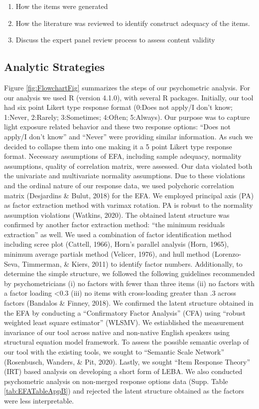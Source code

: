 \documentclass[
  english,
  man]{apa6}
\providecommand{\tightlist}{%
  \setlength{\itemsep}{0pt}\setlength{\parskip}{0pt}}
\begin{document}
\begin{enumerate}
\def\labelenumi{\arabic{enumi}.}
\tightlist
\item
  How the items were generated
\item
  How the literature was reviewed to identify construct adequacy of the items.
\item
  Discuss the expert panel review process to assess content validity
\end{enumerate}

\hypertarget{analytic-strategies}{%
\subsection{Analytic Strategies}\label{analytic-strategies}}

Figure \ref{fig:FlowchartFig} summarizes the steps of our psychometric analysis. For our analysis we used R (version 4.1.0), with several R packages. Initially, our tool had six point Likert type response format (0:Does not apply/I don't know; 1:Never, 2:Rarely; 3:Sometimes; 4:Often; 5:Always). Our purpose was to capture light exposure related behavior and these two response options: ``Does not apply/I don't know'' and ``Never'' were providing similar information. As such we decided to collapse them into one making it a 5 point Likert type response format. Necessary assumptions of EFA, including sample adequacy, normality assumptions, quality of correlation matrix, were assessed. Our data violated both the univariate and multivariate normality assumptions. Due to these violations and the ordinal nature of our response data, we used polychoric correlation matrix (Desjardins \& Bulut, 2018) for the EFA. We employed principal axis (PA) as factor extraction method with varimax rotation. PA is robust to the normality assumption violations (Watkins, 2020). The obtained latent structure was confirmed by another factor extraction method: ``the minimum residuals extraction'' as well. We used a combination of factor identification method including scree plot (Cattell, 1966), Horn's parallel analysis (Horn, 1965), minimum average partials method (Velicer, 1976), and hull method (Lorenzo-Seva, Timmerman, \& Kiers, 2011) to identify factor numbers. Additionally, to determine the simple structure, we followed the following guidelines recommended by psychometricians (i) no factors with fewer than three items (ii) no factors with a factor loading \textless0.3 (iii) no items with cross-loading greater than .3 across factors (Bandalos \& Finney, 2018). We confirmed the latent structure obtained in the EFA by conducting a ``Confirmatory Factor Analysis'' (CFA) using ``robust weighted least square estimator'' (WLSMV). We estiablished the measurement invariance of our tool across native and non-native English speakers using structural equation model framework. To assess the possible semantic overlap of our tool with the existing tools, we sought to ``Semantic Scale Network'' (Rosenbusch, Wanders, \& Pit, 2020). Lastly, we sought ``Item Response Theory'' (IRT) based analysis on developing a short form of LEBA.
We also conducted psychometric analysis on non-merged response options data (Supp. Table \ref{tab:EFATableAppB}) and rejected the latent structure obtained as the factors were less interpretable.
\end{document}
